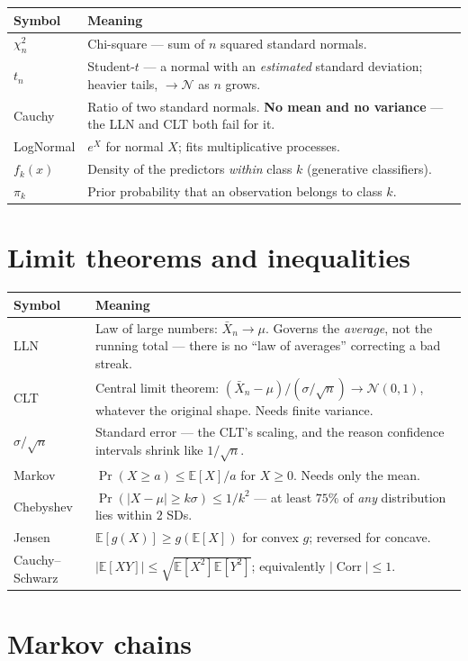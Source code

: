 \documentclass[10pt,letterpaper,onecolumn]{article}
\makeatletter
\newenvironment{symtab}
  {\begin{longtable}{@{}>{\raggedright\arraybackslash}p{0.26\textwidth}%
                       >{\raggedright\arraybackslash}p{0.70\textwidth}@{}}
   \toprule
   \textbf{Symbol} & \textbf{Meaning} \\
   \midrule
   \endhead
   \bottomrule
   \endfoot}
  {\end{longtable}}
\makeatother
\begin{document}
\begin{symtab}
$\chi^2_n$ & Chi-square — sum of $n$ squared standard normals. \\
$t_n$ & Student-$t$ — a normal with an \emph{estimated} standard deviation; heavier tails, $\to\mathcal{N}$ as $n$ grows. \\
Cauchy & Ratio of two standard normals. \textbf{No mean and no variance} — the LLN and CLT both fail for it. \\
LogNormal & $e^{X}$ for normal $X$; fits multiplicative processes. \\
$f_k(x)$ & Density of the predictors \emph{within} class $k$ (generative classifiers). \\
$\pi_k$ & Prior probability that an observation belongs to class $k$. \\
\end{symtab}

\section{Limit theorems and inequalities}

\begin{symtab}
LLN & Law of large numbers: $\bar X_n \to \mu$. Governs the \emph{average}, not the running total — there is no ``law of averages'' correcting a bad streak. \\
CLT & Central limit theorem: $(\bar X_n - \mu)/(\sigma/\sqrt{n}) \to \mathcal{N}(0,1)$, whatever the original shape. Needs finite variance. \\
$\sigma/\sqrt{n}$ & Standard error — the CLT's scaling, and the reason confidence intervals shrink like $1/\sqrt{n}$. \\
Markov & $\Pr(X \ge a) \le \mathbb{E}[X]/a$ for $X \ge 0$. Needs only the mean. \\
Chebyshev & $\Pr(|X-\mu| \ge k\sigma) \le 1/k^2$ — at least $75\%$ of \emph{any} distribution lies within $2$ SDs. \\
Jensen & $\mathbb{E}[g(X)] \ge g(\mathbb{E}[X])$ for convex $g$; reversed for concave. \\
Cauchy--Schwarz & $|\mathbb{E}[XY]| \le \sqrt{\mathbb{E}[X^2]\mathbb{E}[Y^2]}$; equivalently $|\operatorname{Corr}| \le 1$. \\
\end{symtab}

\section{Markov chains}
\end{document}
